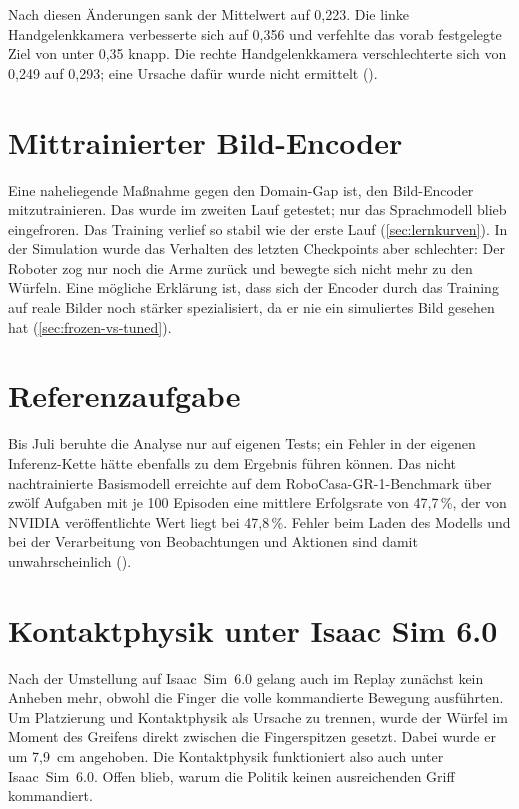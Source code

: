 Nach diesen Änderungen sank der Mittelwert auf 0,223. Die linke
Handgelenkkamera verbesserte sich auf 0,356 und verfehlte das vorab
festgelegte Ziel von unter 0,35 knapp. Die rechte Handgelenkkamera
verschlechterte sich von 0,249 auf 0,293; eine Ursache dafür wurde nicht
ermittelt ().

\section{Mittrainierter Bild-Encoder}
\label{sec:vision-lauf}

Eine naheliegende Maßnahme gegen den Domain-Gap ist, den Bild-Encoder
mitzutrainieren. Das wurde im zweiten Lauf getestet; nur das Sprachmodell
blieb eingefroren. Das Training verlief so stabil wie der erste Lauf
(\cref{sec:lernkurven}). In der Simulation wurde das Verhalten des letzten
Checkpoints aber schlechter: Der Roboter zog nur noch die Arme zurück und
bewegte sich nicht mehr zu den Würfeln. Eine mögliche Erklärung ist, dass sich
der Encoder durch das Training auf reale Bilder noch stärker spezialisiert,
da er nie ein simuliertes Bild gesehen hat (\cref{sec:frozen-vs-tuned}).

\section{Referenzaufgabe}
\label{sec:robocasa}

Bis Juli beruhte die Analyse nur auf eigenen Tests; ein Fehler in der eigenen
Inferenz-Kette hätte ebenfalls zu dem Ergebnis führen können. Das nicht
nachtrainierte Basismodell erreichte auf dem RoboCasa-GR-1-Benchmark über
zwölf Aufgaben mit je 100 Episoden eine mittlere Erfolgsrate von 47,7\,\%,
der von NVIDIA veröffentlichte Wert liegt bei 47,8\,\%. Fehler beim Laden des
Modells und bei der Verarbeitung von Beobachtungen und Aktionen sind damit
unwahrscheinlich ().

\section{Kontaktphysik unter Isaac Sim 6.0}
\label{sec:grasp-befund}

Nach der Umstellung auf Isaac~Sim~6.0 gelang auch im Replay zunächst kein
Anheben mehr, obwohl die Finger die volle kommandierte Bewegung ausführten.
Um Platzierung und Kontaktphysik als Ursache zu trennen, wurde der Würfel im
Moment des Greifens direkt zwischen die Fingerspitzen gesetzt. Dabei wurde er
um 7,9~cm angehoben. Die Kontaktphysik funktioniert also auch unter
Isaac~Sim~6.0. Offen blieb, warum die Politik keinen ausreichenden Griff
kommandiert.

